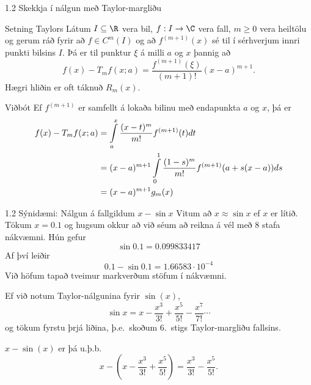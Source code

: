 %
\begin{frame}{1.2 Skekkja í nálgun með Taylor-margliðu} 

\begin{block}{Setning Taylors} Látum $I \subseteq \R$ vera bil, $f : I \to
\C$ vera fall, $m \geq 0$ vera heiltölu og gerum ráð fyrir að $f \in
C^m(I)$ og að $f^{(m+1)}(x)$ sé til í sérhverjum innri punkti bilsins
$I$.  Þá er til punktur $\xi$ á milli $a$ og $x$
þannig að 
\begin{equation*}
  f(x) - T_mf(x;a)= \frac{f^{(m+1)}(\xi)}{(m+1)!}(x-a)^{m+1}.
\end{equation*}
Hægri hliðin er oft táknuð $R_m(x)$.
\end{block}

\pause

\begin{block}{Viðbót}
Ef $f^{(m+1)}$ er samfellt á lokaða bilinu með endapunkta $a$ og $x$,
þá er
\begin{align*}
  f(x) - T_mf(x;a)&= \int\limits_a^x 
  \frac{(x-t)^m}{m!}f^{(m+1)}(t) dt \notag \\
  &= (x-a)^{m+1} \int\limits_0^1 
  \frac{(1-s)^m}{m!} f^{(m+1)}(a + s(x-a)) ds\\
&= (x-a)^{m+1}g_m(x)
\end{align*}
\end{block}

\end{frame}
%
\begin{frame}{1.2 Sýnidæmi: Nálgun á fallgildum $x-\sin x$} 
Vitum að $x \approx \sin x$ ef $x$ er lítið. \pause 
Tökum $x=0.1$ og hugsum okkur að
við séum að reikna á vél með 8 stafa nákvæmni.     \pause Hún gefur 
\begin{equation*}
    \sin 0.1 = 0.099833417
\end{equation*}\pause
Af því leiðir
\begin{equation*}
    0.1 - \sin 0.1 = 1.66583\cdot 10^{-4}
\end{equation*}
Við höfum tapað tveimur markverðum stöfum í nákvæmni. 

Ef við notum Taylor-nálgunina fyrir $\sin(x)$,
\begin{equation*}
    \sin x = x - \frac{x^3}{3!} + \frac{x^5}{5!} 
    - \frac{x^7}{7!} \cdots
\end{equation*}
og tökum fyrstu þrjá liðina, þ.e.~skoðum 6.~stigs Taylor-margliðu fallsins. \pause


$x-\sin(x)$ er þá u.þ.b.
$$
x - \left(x - \frac{x^3}{3!} + \frac{x^5}{5!}\right) = \frac{x^3}{3!} - \frac{x^5}{5!}.
$$
\end{frame}

